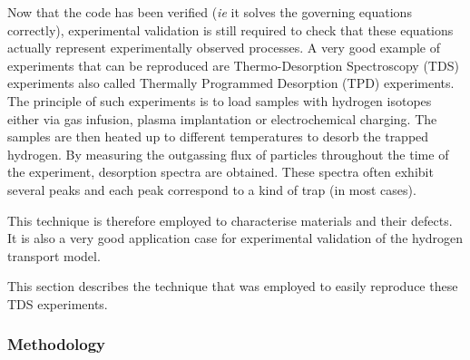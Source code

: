 Now that the code has been verified (\textit{ie} it solves the governing equations correctly), experimental validation is still required to check that these equations actually represent experimentally observed processes.
A very good example of experiments that can be reproduced are Thermo-Desorption Spectroscopy (TDS) experiments also called Thermally Programmed Desorption (TPD) experiments.
The principle of such experiments is to load samples with hydrogen isotopes either via gas infusion, plasma implantation or electrochemical charging.
The samples are then heated up to different temperatures to desorb the trapped hydrogen.
By measuring the outgassing flux of particles throughout the time of the experiment, desorption spectra are obtained.
These spectra often exhibit several peaks and each peak correspond to a kind of trap (in most cases).

This technique is therefore employed to characterise materials and their defects. 
It is also a very good application case for experimental validation of the hydrogen transport model.

This section describes the technique that was employed to easily reproduce these TDS experiments.

\subsubsection{Methodology} \label{methodology}


